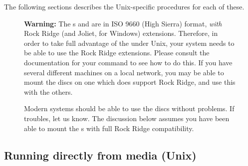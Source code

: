 \documentclass{article}
\begin{document}
\noindent The following sections describes the Unix-specific procedures
for each of these.

\ifSingleColumn \begin{figure}[ht]\noindent \fi
\begin{warningbox}
\textbf{Warning: } The \TK{} \CD{}s and \DVD{} are in ISO 9660 (High Sierra)
format, \emph{with} Rock Ridge (and Joliet, for Windows)
extensions. Therefore, in order to take full advantage of the \TK{}
under Unix, your system needs to be able to use the Rock Ridge
extensions.  Please consult the documentation for your 
command to see how to do this.  If you have several different machines
on a local network, you may be able to mount the discs on one which
does support Rock Ridge, and use this with the others.

\leavevmode\quad Modern systems should be able to use the discs without
problems.  If troubles, let us know.  The discussion below assumes you
have been able to mount the \CD{}s with full Rock Ridge compatibility.
\end{warningbox}
\ifSingleColumn\end{figure}\fi


% 
\subsection{Running \protect\TL{} directly from media (Unix)}

\def\runlive{%
It is possible to use the \TeX{} system directly from the \pkgname{live}
\DVD{}, without installing the distribution to disk.  (Thus the name
\TeX\ `Live', in fact.)  It is \emph{not} possible to run \TeX{}
directly from the other \CD{}s (see section~\ref{sec:multiple-dist},
\p.\pageref{sec:multiple-dist}).
}

\def\startinst{%
To start, you mount the \CD{} or \DVD{}, with Rock Ridge extensions
enabled.  The exact command to do this varies from system to system; the
following works under Linux, except the name of the device
(\filename{/dev/cdrom}, here) may vary. (All our examples will use
\texttt{>} as the shell prompt; user input is
\Ucom{\texttt{underlined}}.)
\begin{alltt}
> \Ucom{mount -t iso9660 /dev/cdrom /mnt/cdrom}
\end{alltt}

\noindent Change the current directory to the mount point:
\begin{alltt}
> \Ucom{cd /mnt/cdrom}
\end{alltt}

\noindent Under \MacOSX, the directory is typically under
\dirname{/Volumes}, and the media will be mounted automatically.
}
\end{document}
